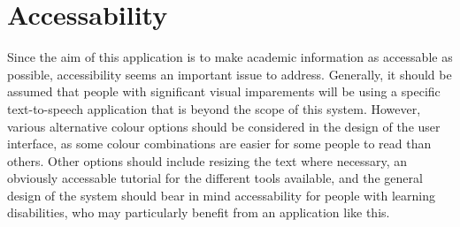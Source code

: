 \documentclass{article}
\begin{document}
\section{Accessability}

Since the aim of this application is to make academic information as accessable as possible, accessibility seems an important issue to address. Generally, it should be assumed that people with significant visual imparements will be using a specific text-to-speech application that is beyond the scope of this system. However, various alternative colour options should be considered in the design of the user interface, as some colour combinations are easier for some people to read than others. Other options should include resizing the text where necessary, an obviously accessable tutorial for the different tools available, and the general design of the system should bear in mind accessability for people with learning disabilities, who may particularly benefit from an application like this.
\end{document}

